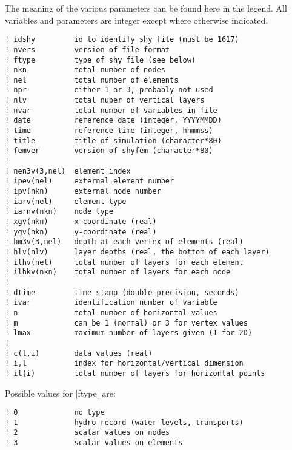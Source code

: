 The meaning of the various parameters can be found here in the legend.
All variables and parameters are integer except where otherwise indicated.

\begin{verbatim}
! idshy         id to identify shy file (must be 1617)
! nvers         version of file format
! ftype         type of shy file (see below)
! nkn           total number of nodes
! nel           total number of elements
! npr           either 1 or 3, probably not used
! nlv           total nuber of vertical layers
! nvar          total number of variables in file
! date          reference date (integer, YYYYMMDD)
! time          reference time (integer, hhmmss)
! title         title of simulation (character*80)
! femver        version of shyfem (character*80)
!
! nen3v(3,nel)  element index
! ipev(nel)     external element number
! ipv(nkn)      external node number
! iarv(nel)     element type
! iarnv(nkn)    node type
! xgv(nkn)      x-coordinate (real)
! ygv(nkn)      y-coordinate (real)
! hm3v(3,nel)   depth at each vertex of elements (real)
! hlv(nlv)      layer depths (real, the bottom of each layer)
! ilhv(nel)     total number of layers for each element
! ilhkv(nkn)    total number of layers for each node
!
! dtime         time stamp (double precision, seconds)
! ivar          identification number of variable
! n             total number of horizontal values
! m             can be 1 (normal) or 3 for vertex values
! lmax          maximum number of layers given (1 for 2D)
!
! c(l,i)        data values (real)
! i,l           index for horizontal/vertical dimension
! il(i)         total number of layers for horizontal points
\end{verbatim}

Possible values for |ftype| are:

\begin{verbatim}
! 0             no type
! 1             hydro record (water levels, transports)
! 2             scalar values on nodes
! 3             scalar values on elements
\end{verbatim}


